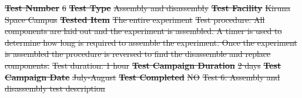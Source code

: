 \documentclass[a4paper,12pt,twoside]{article}
\providecommand{\DIFdeltex}[1]{{\protect\color{red}\sout{#1}}}                      %
\providecommand{\DIFdelFL}[1]{\DIFdel{#1}} %
\providecommand{\DIFdelbeginFL}{} %
\providecommand{\DIFdel}[1]{\texorpdfstring{\DIFdeltex{#1}}{}} %
\newcommand{\DIFscaledelfig}{0.5}
\newlength{\DIFdelgraphicswidth} %
\newlength{\DIFdelgraphicsheight} %
\newcommand{\DIFdelincludegraphics}[2][]{%
\sbox{\DIFdelgraphicsbox}{\DIFOincludegraphics[#1]{#2}}%
\settoboxwidth{\DIFdelgraphicswidth}{\DIFdelgraphicsbox} %
\settoboxtotalheight{\DIFdelgraphicsheight}{\DIFdelgraphicsbox} %
\scalebox{\DIFscaledelfig}{%
\parbox[b]{\DIFdelgraphicswidth}{\usebox{\DIFdelgraphicsbox}\\[-\baselineskip] \rule{\DIFdelgraphicswidth}{0em}}\llap{\resizebox{\DIFdelgraphicswidth}{\DIFdelgraphicsheight}{%
\setlength{\unitlength}{\DIFdelgraphicswidth}%
\begin{picture}(1,1)%
\thicklines\linethickness{2pt} %
{\color[rgb]{1,0,0}\put(0,0){\framebox(1,1){}}}%
{\color[rgb]{1,0,0}\put(0,0){\line( 1,1){1}}}%
{\color[rgb]{1,0,0}\put(0,1){\line(1,-1){1}}}%
\end{picture}%
}\hspace*{3pt}}} %
} %
\DeclareRobustCommand{\DIFdelbeginFL}{\DIFOdelbeginFL \let\includegraphics\DIFdelincludegraphics} %
\begin{document}
\DIFdelbeginFL %
\textbf{\DIFdelFL{Test Number}} %
\DIFdelFL{6 }%
\textbf{\DIFdelFL{Test Type}} %
\DIFdelFL{Assembly and disassembly }%
\textbf{\DIFdelFL{Test Facility}} %
\DIFdelFL{Kiruna Space Campus }%
\textbf{\DIFdelFL{Tested Item}} %
\DIFdelFL{The entire experiment }%
\DIFdelFL{Test procedure: All components are laid out and the experiment is assembled. A timer is used to determine how long is required to assemble the experiment. Once the experiment is assembled the procedure is reversed to find the disassemble and replace components.}%
\DIFdelFL{Test duration: 1 hour }%
\textbf{\DIFdelFL{Test Campaign Duration}} %
\DIFdelFL{2 days }%
\textbf{\DIFdelFL{Test Campaign Date}} %
\DIFdelFL{July-August }%
\textbf{\DIFdelFL{Test Completed}} %
\DIFdelFL{NO }%
{%
\DIFdelFL{Test 6: Assembly and disassembly test description}}

\end{document}
